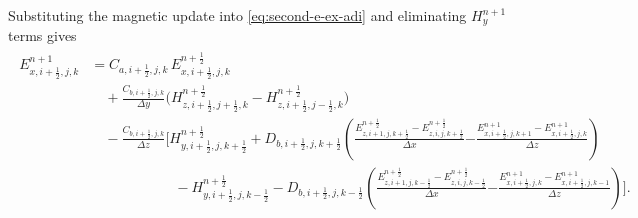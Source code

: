 \documentclass{article}
\numberwithin{equation}{section}
\numberwithin{figure}{section}
\begin{document}
Substituting the magnetic update into \eqref{eq:second-e-ex-adi} and eliminating $H_{y}^{n+1}$ terms gives
\begin{align}
    \begin{split}
        E_{x,i+\tfrac12,j,k}^{n+1} & = C_{a,i+\tfrac12,j,k}\,E_{x,i+\tfrac12,j,k}^{n+\frac12}                                                                                                                                                                                                                                                               \\
                                   & \quad + \frac{C_{b,i+\tfrac12,j,k}}{\Delta y}\Big(H_{z,i+\tfrac12,j+\tfrac12,k}^{n+\frac12}-H_{z,i+\tfrac12,j-\tfrac12,k}^{n+\frac12}\Big)                                                                                                                                                                             \\
                                   & \quad - \frac{C_{b,i+\tfrac12,j,k}}{\Delta z}\Bigg[H_{y,i+\tfrac12,j,k+\tfrac12}^{n+\frac12} + D_{b,i+\tfrac12,j,k+\tfrac12}\left(\frac{E_{z,i+1,j,k+\tfrac12}^{n+\frac12}-E_{z,i,j,k+\tfrac12}^{n+\frac12}}{\Delta x}\right. \left. - \frac{E_{x,i+\tfrac12,j,k+1}^{n+1}-E_{x,i+\tfrac12,j,k}^{n+1}}{\Delta z}\right) \\
                                   & \qquad\qquad\qquad - H_{y,i+\tfrac12,j,k-\tfrac12}^{n+\frac12} - D_{b,i+\tfrac12,j,k-\tfrac12}\left(\frac{E_{z,i+1,j,k-\tfrac12}^{n+\frac12}-E_{z,i,j,k-\tfrac12}^{n+\frac12}}{\Delta x}\right. \left. - \frac{E_{x,i+\tfrac12,j,k}^{n+1}-E_{x,i+\tfrac12,j,k-1}^{n+1}}{\Delta z}\right)\Bigg].
    \end{split}
\end{align}
\end{document}
